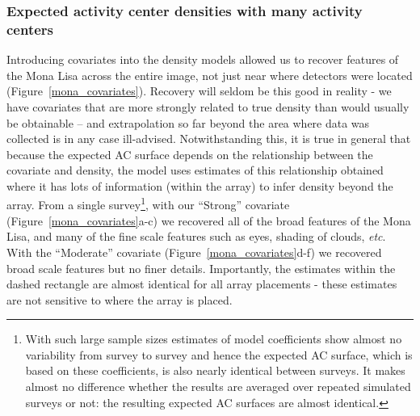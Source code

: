 \documentclass[10pt,a4paper]{article}
\begin{document}
\subsubsection{Expected activity center densities with many activity centers}

Introducing covariates into the density models allowed us to recover features of the Mona Lisa across the entire image, not just near where detectors were located (Figure~\ref{mona_covariates}). Recovery will seldom be this good in reality - we have covariates that are more strongly related to true density than would usually be obtainable -- and extrapolation so far beyond the area where data was collected is in any case ill-advised. Notwithstanding this, it is true in general that because the expected AC surface depends on the relationship between the covariate and density, the model uses estimates of this relationship obtained where it has lots of information (within the array) to infer density beyond the array. From a single survey\footnote{With such large sample sizes estimates of model coefficients show almost no variability from survey to survey and hence the expected AC surface, which is based on these coefficients, is also nearly identical between surveys. It makes almost no difference whether the results are averaged over repeated simulated surveys or not: the resulting expected AC surfaces are almost identical.}, with our ``Strong'' covariate (Figure~\ref{mona_covariates}a-c) we recovered all of the broad features of the Mona Lisa, and many of the fine scale features such as eyes, shading of clouds, {\it etc}. With the ``Moderate'' covariate (Figure~\ref{mona_covariates}d-f) we recovered broad scale features but no finer details. Importantly, the estimates within the dashed rectangle are almost identical for all array placements - these estimates are not sensitive to where the array is placed.

\end{document}
